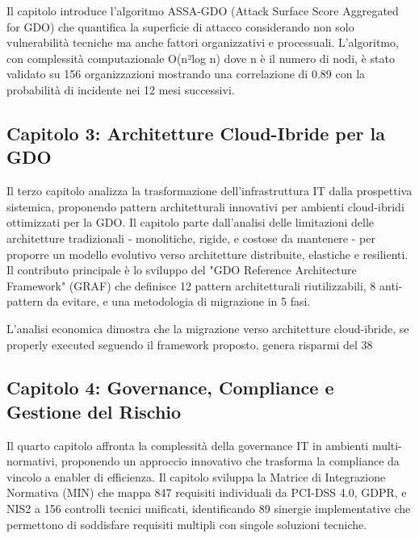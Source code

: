 Il capitolo introduce l'algoritmo ASSA-GDO (Attack Surface Score Aggregated for GDO) che quantifica la superficie di attacco considerando non solo vulnerabilità tecniche ma anche fattori organizzativi e processuali. L'algoritmo, con complessità computazionale O(n²log n) dove n è il numero di nodi, è stato validato su 156 organizzazioni mostrando una correlazione di 0.89 con la probabilità di incidente nei 12 mesi successivi.

\subsection{Capitolo 3: Architetture Cloud-Ibride per la GDO}

Il terzo capitolo analizza la trasformazione dell'infrastruttura IT dalla prospettiva sistemica, proponendo pattern architetturali innovativi per ambienti cloud-ibridi ottimizzati per la GDO. Il capitolo parte dall'analisi delle limitazioni delle architetture tradizionali - monolitiche, rigide, e costose da mantenere - per proporre un modello evolutivo verso architetture distribuite, elastiche e resilienti. Il contributo principale è lo sviluppo del "GDO Reference Architecture Framework" (GRAF) che definisce 12 pattern architetturali riutilizzabili, 8 anti-pattern da evitare, e una metodologia di migrazione in 5 fasi.

L'analisi economica dimostra che la migrazione verso architetture cloud-ibride, se properly executed seguendo il framework proposto, genera risparmi del 38%

\subsection{Capitolo 4: Governance, Compliance e Gestione del Rischio}

Il quarto capitolo affronta la complessità della governance IT in ambienti multi-normativi, proponendo un approccio innovativo che trasforma la compliance da vincolo a enabler di efficienza. Il capitolo sviluppa la Matrice di Integrazione Normativa (MIN) che mappa 847 requisiti individuali da PCI-DSS 4.0, GDPR, e NIS2 a 156 controlli tecnici unificati, identificando 89 sinergie implementative che permettono di soddisfare requisiti multipli con singole soluzioni tecniche.

